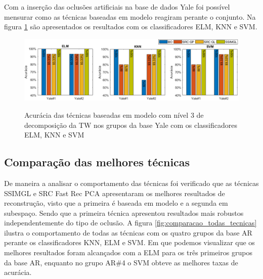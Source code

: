 Com a inserção das oclusões artificiais na base de dados Yale foi possível mensurar como as técnicas baseadas em modelo reagiram perante o conjunto. Na figura \ref{fig:acuracia_ELM_Yale} são apresentados os resultados com os classificadores ELM, KNN e SVM.

\begin{figure}[H]
\centering
\caption{Acurácia das técnicas baseadas em modelo com nível 3 de decomposição da TW nos grupos da base Yale com os classificadores ELM, KNN e SVM}
\includegraphics[scale=0.55]{imgs4/acuracia/acuracias_modelo_gerais}
\label{fig:acuracia_ELM_Yale}
\end{figure}


%
%





\subsection{Comparação das melhores técnicas}


De maneira a analisar o comportamento das técnicas foi verificado que as técnicas SSIMGL e SRC Fast Rec PCA apresentaram os melhores resultados de reconstrução, visto que a primeira é baseada em modelo e a segunda em subespaço. Sendo que a primeira técnica apresentou resultados mais robustos independentemente do tipo de oclusão. A figura \ref{fig:comparacao_todas_tecnicas} ilustra o comportamento de todas as técnicas com os quatro grupos da base AR perante os classificadores KNN, ELM e SVM. Em que podemos visualizar que os melhores resultados foram alcançados com a  ELM para os três primeiros grupos da base AR, enquanto no grupo AR\#4  o SVM obteve as melhores taxas de acurácia.


